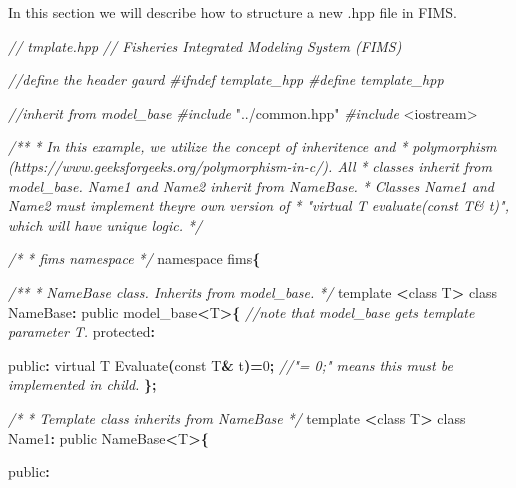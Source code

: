 \documentclass[
]{book}
\newenvironment{Shaded}{\begin{snugshade}}{\end{snugshade}}
\newcommand{\CommentTok}[1]{\textcolor[rgb]{0.56,0.35,0.01}{\textit{#1}}}
\newcommand{\DataTypeTok}[1]{\textcolor[rgb]{0.13,0.29,0.53}{#1}}
\newcommand{\DecValTok}[1]{\textcolor[rgb]{0.00,0.00,0.81}{#1}}
\newcommand{\ImportTok}[1]{#1}
\newcommand{\NormalTok}[1]{#1}
\newcommand{\OperatorTok}[1]{\textcolor[rgb]{0.81,0.36,0.00}{\textbf{#1}}}
\newcommand{\PreprocessorTok}[1]{\textcolor[rgb]{0.56,0.35,0.01}{\textit{#1}}}
\begin{document}
In this section we will describe how to structure a new .hpp file in FIMS.

\begin{Shaded}
\begin{Highlighting}[]
\CommentTok{//  tmplate.hpp}
\CommentTok{//  Fisheries Integrated Modeling System (FIMS)}

\CommentTok{//define the header gaurd}
\PreprocessorTok{\#ifndef template\_hpp }
\PreprocessorTok{\#define template\_hpp}

\CommentTok{//inherit from model\_base}
\PreprocessorTok{\#include }\ImportTok{"../common.hpp"}\PreprocessorTok{ }
\PreprocessorTok{\#include }\ImportTok{\textless{}iostream\textgreater{}}

\CommentTok{/**}
\CommentTok{ * In this example, we utilize the concept of inheritence and }
\CommentTok{ * polymorphism (https://www.geeksforgeeks.org/polymorphism{-}in{-}c/). All}
\CommentTok{ * classes inherit from model\_base. Name1 and Name2 inherit from NameBase.}
\CommentTok{ * Classes Name1 and Name2 must implement they\textquotesingle{}re own version of }
\CommentTok{ * "virtual T evaluate(const T\& t)", which will have unique logic. }
\CommentTok{ */}


\CommentTok{/*}
\CommentTok{ * fims namespace}
\CommentTok{ */}
\NormalTok{namespace fims}\OperatorTok{\{}

\CommentTok{/**}
\CommentTok{ * NameBase class. Inherits from model\_base.}
\CommentTok{ */}
\NormalTok{template }\OperatorTok{\textless{}}\NormalTok{class T}\OperatorTok{\textgreater{}}
\NormalTok{class NameBase}\OperatorTok{:}\NormalTok{ public model\_base}\OperatorTok{\textless{}}\NormalTok{T}\OperatorTok{\textgreater{}\{} \CommentTok{//note that model\_base gets template parameter T.}
\NormalTok{protected}\OperatorTok{:}

\NormalTok{public}\OperatorTok{:}
\NormalTok{  virtual T Evaluate}\OperatorTok{(}\DataTypeTok{const}\NormalTok{ T}\OperatorTok{\&}\NormalTok{ t}\OperatorTok{)=}\DecValTok{0}\OperatorTok{;} \CommentTok{//"= 0;" means this must be implemented in child.}
\OperatorTok{\};}
  
\CommentTok{/* }
\CommentTok{* Template class inherits from  NameBase}
\CommentTok{*/}
\NormalTok{template }\OperatorTok{\textless{}}\NormalTok{class T}\OperatorTok{\textgreater{}}
\NormalTok{class Name1}\OperatorTok{:}\NormalTok{ public NameBase}\OperatorTok{\textless{}}\NormalTok{T}\OperatorTok{\textgreater{}\{}

\NormalTok{public}\OperatorTok{:}
 

\end{Highlighting}
\end{Shaded}
\end{document}
